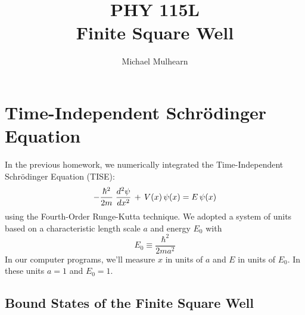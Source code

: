 \documentclass[12pt]{book}
\begin{document}
\newcommand{\ihbar}{\ensuremath{i \hbar}}
\newcommand{\Pss}{\ensuremath{\Psi^*}}
\newcommand{\dPsidt}{\ensuremath{ \frac{\partial \Psi}{\partial t} }}
\newcommand{\dPsidx}{\ensuremath{ \frac{\partial \Psi}{\partial x} }}
\newcommand{\ddPsidx}{\ensuremath{ \frac{\partial^2 \Psi}{\partial x^2} }}
\newcommand{\dPssdt}{\ensuremath{ \frac{\partial \Psi^*}{\partial t} }}
\newcommand{\dPssdx}{\ensuremath{ \frac{\partial \Psi^*}{\partial x} }}
\newcommand{\ddPssdx}{\ensuremath{ \frac{\partial^2 \Psi^*}{\partial x^2} }}

\newcommand{\dphidt}{\ensuremath{ \frac{d \phi}{dt} }}
\newcommand{\dpsidx}{\ensuremath{ \frac{d \psi}{dx} }}
\newcommand{\ddpsidx}{\ensuremath{ \frac{d^2 \psi}{dx^2} }}


\title{PHY 115L \\ Finite Square Well}
\author{Michael Mulhearn}

\maketitle

\setcounter{chapter}{0}
\chapter{Time-Independent Schr\"odinger Equation}

In the previous homework, we numerically integrated the Time-Independent Schr\"odinger Equation (TISE):
\begin{equation}
- \frac{\hbar^2}{2 m} \; \ddpsidx \, + \, V(x) \, \psi(x) = E \, \psi(x)\\
\end{equation}
using the Fourth-Order Runge-Kutta technique.  We adopted a system of units based on a characteristic length scale $a$ and energy $E_0$ with
\begin{equation}
E_0 \equiv \frac{\hbar^2}{2ma^2}
\end{equation}
In our computer programs, we'll measure $x$ in units of $a$ and $E$ in units of $E_0$.  In these units $a=1$ and $E_0=1$.

\section{Bound States of the Finite Square Well}
\end{document}
